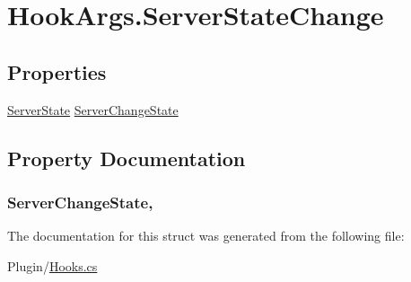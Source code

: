\hypertarget{structOTA_1_1Plugin_1_1HookArgs_1_1ServerStateChange}{}\section{Hook\+Args.\+Server\+State\+Change}
\label{structOTA_1_1Plugin_1_1HookArgs_1_1ServerStateChange}
\subsection*{Properties}
\begin{DoxyCompactItemize}
\item 
\hyperlink{namespaceOTA_aeee15ce451435cc7f2fdb211337d0694}{Server\+State} \hyperlink{structOTA_1_1Plugin_1_1HookArgs_1_1ServerStateChange_aea80ca16c6c54b7aa1c6e85ee29d9310}{Server\+Change\+State}
\end{DoxyCompactItemize}


\subsection{Property Documentation}
\hypertarget{structOTA_1_1Plugin_1_1HookArgs_1_1ServerStateChange_aea80ca16c6c54b7aa1c6e85ee29d9310}{}
\subsubsection[{Server\+Change\+State}]{ Server\+Change\+State\hspace{0.3cm}{\ttfamily [get]}, {\ttfamily [set]}}\label{structOTA_1_1Plugin_1_1HookArgs_1_1ServerStateChange_aea80ca16c6c54b7aa1c6e85ee29d9310}


The documentation for this struct was generated from the following file\+:\begin{DoxyCompactItemize}
\item 
Plugin/\hyperlink{Hooks_8cs}{Hooks.\+cs}\end{DoxyCompactItemize}
